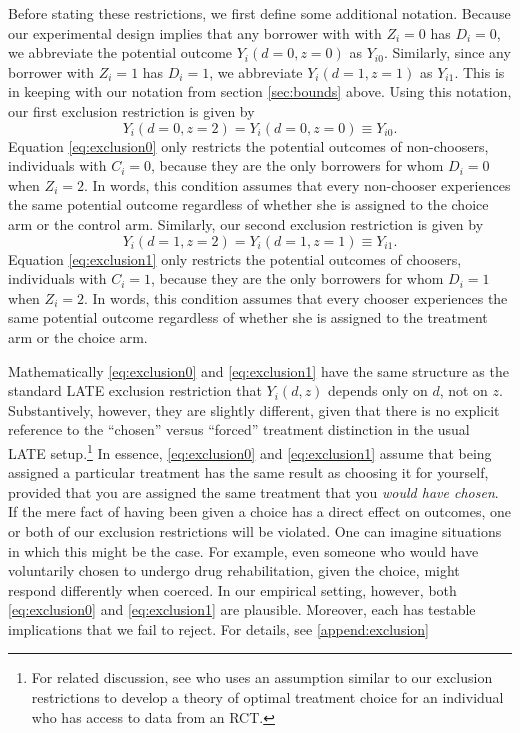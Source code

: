 \documentclass[oneside,11pt]{article}
\begin{document}
Before stating these restrictions, we first define some additional notation.
Because our experimental design implies that any borrower with with $Z_i = 0$ has $D_i = 0$, we abbreviate the potential outcome $Y_i(d=0,z=0)$ as $Y_{i0}$. 
Similarly, since any borrower with $Z_i = 1$ has $D_i = 1$, we abbreviate $Y_i(d=1,z=1)$ as $Y_{i1}$. 
This is in keeping with our notation from section \ref{sec:bounds} above.
Using this notation, our first exclusion restriction is given by
\begin{equation}
Y_i(d=0,z=2) = Y_i(d=0,z=0) \equiv Y_{i0}.
\label{eq:exclusion0}
\end{equation}
Equation \ref{eq:exclusion0} only restricts the potential outcomes of non-choosers,  individuals with $C_i = 0$, because they are the only borrowers for whom $D_i = 0$ when $Z_i = 2$.
In words, this condition assumes that every non-chooser experiences the same potential outcome regardless of whether she is assigned to the choice arm or the control arm.
Similarly, our second exclusion restriction is given by
\begin{equation}
Y_i(d=1,z=2) = Y_i(d=1,z=1)\equiv Y_{i1}.
\label{eq:exclusion1}
\end{equation}
Equation \ref{eq:exclusion1} only restricts the potential outcomes of choosers, individuals with $C_i =1$, because they are the only borrowers for whom $D_i = 1$ when $Z_i = 2$.
In words, this condition assumes that every chooser experiences the same potential outcome regardless of whether she is assigned to the treatment arm or the choice arm.

Mathematically \eqref{eq:exclusion0} and \eqref{eq:exclusion1} have the same structure as the standard LATE exclusion restriction that $Y_i(d,z)$ depends only on $d$, not on $z$. 
Substantively, however, they are slightly different, given that there is no explicit reference to the ``chosen'' versus ``forced'' treatment distinction in the usual LATE setup.\footnote{For related discussion, see \cite{chamberlain2011bayesian} who uses an assumption similar to our exclusion restrictions to develop a theory of optimal treatment choice for an individual who has access to data from an RCT.} 
In essence, \eqref{eq:exclusion0} and \eqref{eq:exclusion1} assume that being assigned a particular treatment has the same result as choosing it for yourself, provided that you are assigned the same treatment that you \emph{would have chosen}. 
If the mere fact of having been given a choice has a direct effect on outcomes, one or both of our exclusion restrictions will be violated.
One can imagine situations in which this might be the case.
For example, even someone who would have voluntarily chosen to undergo drug rehabilitation, given the choice, might respond differently when coerced.
In our empirical setting, however, both \eqref{eq:exclusion0} and \eqref{eq:exclusion1} are plausible. 
Moreover, each has testable implications that we fail to reject.
For details, see \ref{append:exclusion}
\end{document}
